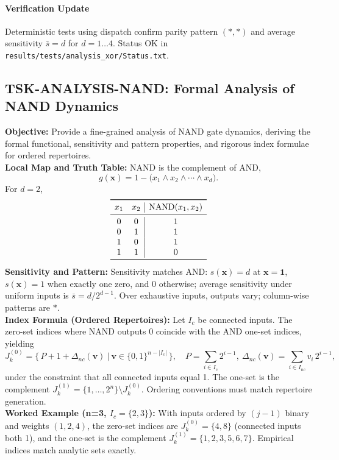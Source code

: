 \documentclass{article}
\begin{document}
\paragraph{Verification Update} Deterministic tests using dispatch confirm parity pattern \((* , *)\) and average sensitivity \(\bar{s}=d\) for \(d=1\dots4\). Status OK in \texttt{results/tests/analysis\_xor/Status.txt}.


\subsection{TSK-ANALYSIS-NAND: Formal Analysis of NAND Dynamics}
\textbf{Objective:} Provide a fine-grained analysis of NAND gate dynamics, deriving the formal functional, sensitivity and pattern properties, and rigorous index formulae for ordered repertoires.\\
\textbf{Local Map and Truth Table:} NAND is the complement of AND,
\[
g(\mathbf{x}) = 1 - \big( x_1 \land x_2 \land \cdots \land x_d \big).
\]
For \(d=2\),
\[
\begin{array}{cc|c}
\toprule
 x_1 & x_2 & \mathrm{NAND}(x_1,x_2) \\
\midrule
 0 & 0 & 1 \\
 0 & 1 & 1 \\
 1 & 0 & 1 \\
 1 & 1 & 0 \\
\bottomrule
\end{array}
\]
\textbf{Sensitivity and Pattern:} Sensitivity matches AND: \(s(\mathbf{x})=d\) at \(\mathbf{x}=\mathbf{1}\), \(s(\mathbf{x})=1\) when exactly one zero, and 0 otherwise; average sensitivity under uniform inputs is \(\bar{s}=d/2^{d-1}\). Over exhaustive inputs, outputs vary; column-wise patterns are \(*\).\\
\textbf{Index Formula (Ordered Repertoires):} Let \(I_c\) be connected inputs. The zero-set indices where NAND outputs 0 coincide with the AND one-set indices, yielding
\[
J_k^{(0)}=\big\{\,P+1+\Delta_{nc}(\mathbf{v})\ \big|\ \mathbf{v}\in\{0,1\}^{n-\lvert I_c\rvert}\,\big\},\quad P=\sum_{i\in I_c}2^{i-1},\ \Delta_{nc}(\mathbf{v})=\sum_{i\in I_{nc}} v_i\,2^{i-1},
\]
under the constraint that all connected inputs equal 1. The one-set is the complement \(J_k^{(1)}=\{1,\dots,2^n\}\setminus J_k^{(0)}\). Ordering conventions must match repertoire generation.\\
\textbf{Worked Example (n=3, \(I_c=\{2,3\}\)):} With inputs ordered by \((j-1)\) binary and weights \((1,2,4)\), the zero-set indices are \(J_k^{(0)}=\{4,8\}\) (connected inputs both 1), and the one-set is the complement \(J_k^{(1)}=\{1,2,3,5,6,7\}\). Empirical indices match analytic sets exactly.\\
\end{document}
